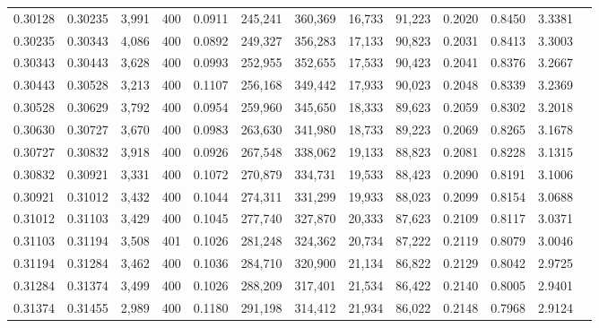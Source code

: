 \begin{tabular}{rrrrrrrrrrrrr}
0.30128 & 0.30235 &  3,991 & 400 &                                     0.0911 & 245,241 & 360,369 &  16,733 &  91,223 & 0.2020 & 0.8450 & 3.3381 \\
0.30235 & 0.30343 &  4,086 & 400 &                                     0.0892 & 249,327 & 356,283 &  17,133 &  90,823 & 0.2031 & 0.8413 & 3.3003 \\
0.30343 & 0.30443 &  3,628 & 400 &                                     0.0993 & 252,955 & 352,655 &  17,533 &  90,423 & 0.2041 & 0.8376 & 3.2667 \\
0.30443 & 0.30528 &  3,213 & 400 &                                     0.1107 & 256,168 & 349,442 &  17,933 &  90,023 & 0.2048 & 0.8339 & 3.2369 \\
0.30528 & 0.30629 &  3,792 & 400 &                                     0.0954 & 259,960 & 345,650 &  18,333 &  89,623 & 0.2059 & 0.8302 & 3.2018 \\
0.30630 & 0.30727 &  3,670 & 400 &                                     0.0983 & 263,630 & 341,980 &  18,733 &  89,223 & 0.2069 & 0.8265 & 3.1678 \\
0.30727 & 0.30832 &  3,918 & 400 &                                     0.0926 & 267,548 & 338,062 &  19,133 &  88,823 & 0.2081 & 0.8228 & 3.1315 \\
0.30832 & 0.30921 &  3,331 & 400 &                                     0.1072 & 270,879 & 334,731 &  19,533 &  88,423 & 0.2090 & 0.8191 & 3.1006 \\
0.30921 & 0.31012 &  3,432 & 400 &                                     0.1044 & 274,311 & 331,299 &  19,933 &  88,023 & 0.2099 & 0.8154 & 3.0688 \\
0.31012 & 0.31103 &  3,429 & 400 &                                     0.1045 & 277,740 & 327,870 &  20,333 &  87,623 & 0.2109 & 0.8117 & 3.0371 \\
0.31103 & 0.31194 &  3,508 & 401 &                                     0.1026 & 281,248 & 324,362 &  20,734 &  87,222 & 0.2119 & 0.8079 & 3.0046 \\
0.31194 & 0.31284 &  3,462 & 400 &                                     0.1036 & 284,710 & 320,900 &  21,134 &  86,822 & 0.2129 & 0.8042 & 2.9725 \\
0.31284 & 0.31374 &  3,499 & 400 &                                     0.1026 & 288,209 & 317,401 &  21,534 &  86,422 & 0.2140 & 0.8005 & 2.9401 \\
0.31374 & 0.31455 &  2,989 & 400 &                                     0.1180 & 291,198 & 314,412 &  21,934 &  86,022 & 0.2148 & 0.7968 & 2.9124 \\

\end{tabular}
